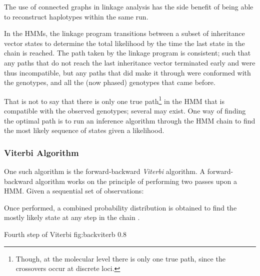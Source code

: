 The use of connected graphs in linkage analysis has the side benefit of being able to reconstruct haplotypes within the same run.

In the HMMs, the linkage program transitions between a subset of inheritance vector states to determine the total likelihood by the time the last state in the chain is reached. The path taken by the linkage program is consistent; such that any paths that do not reach the last inheritance vector terminated early and were thus incompatible, but any paths that did make it through were conformed with the genotypes, and all the (now phased) genotypes that came before.

That is not to say that there is only one true path\footnote{Though, at the molecular level there is only one true path, since the crossovers  occur at discrete loci.} in the HMM that is compatible with the observed genotypes; several may exist.  One way of finding the optimal path is to run an inference algorithm through the HMM chain to find the most likely sequence of states given a likelihood.


\subsubsection{Viterbi Algorithm}

One such algorithm is the forward-backward \textit{Viterbi} algorithm. A forward-backward algorithm works on the principle of performing two passes upon a HMM. Given a sequential set of observations:

\begin{enumerate}[labelsep=2em, align=right, labelwidth=3em, labelindent=4em, leftmargin=*]
\end{enumerate}

Once performed, a combined probability distribution is obtained to find the mostly likely state at any step in the chain \cite{viterbi1967error}.

	{Fourth step of Viterbi}
	{fig:backviterb}
	{0.8}
	{}


